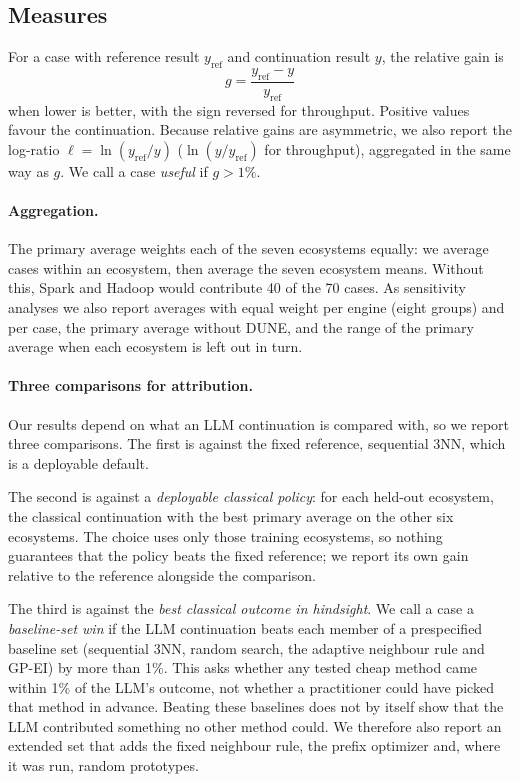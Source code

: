 \subsection{Measures}

For a case with reference result $y_{\mathrm{ref}}$ and continuation result $y$, the relative gain is
\[
g = \frac{y_{\mathrm{ref}} - y}{y_{\mathrm{ref}}}
\]
when lower is better, with the sign reversed for throughput. Positive values favour the continuation. Because relative gains are asymmetric, we also report the log-ratio $\ell = \ln(y_{\mathrm{ref}}/y)$ ($\ln(y/y_{\mathrm{ref}})$ for throughput), aggregated in the same way as $g$. We call a case \emph{useful} if $g > 1\%$.

\paragraph{Aggregation.} The primary average weights each of the seven ecosystems equally: we average cases within an ecosystem, then average the seven ecosystem means. Without this, Spark and Hadoop would contribute 40 of the 70 cases. As sensitivity analyses we also report averages with equal weight per engine (eight groups) and per case, the primary average without DUNE, and the range of the primary average when each ecosystem is left out in turn.

\paragraph{Three comparisons for attribution.} Our results depend on what an LLM continuation is compared with, so we report three comparisons. The first is against the fixed reference, sequential 3NN, which is a deployable default.

The second is against a \emph{deployable classical policy}: for each held-out ecosystem, the classical continuation with the best primary average on the other six ecosystems. The choice uses only those training ecosystems, so nothing guarantees that the policy beats the fixed reference; we report its own gain relative to the reference alongside the comparison.

The third is against the \emph{best classical outcome in hindsight}. We call a case a \emph{baseline-set win} if the LLM continuation beats each member of a prespecified baseline set (sequential 3NN, random search, the adaptive neighbour rule and GP-EI) by more than 1\%. This asks whether any tested cheap method came within 1\% of the LLM's outcome, not whether a practitioner could have picked that method in advance. Beating these baselines does not by itself show that the LLM contributed something no other method could. We therefore also report an extended set that adds the fixed neighbour rule, the prefix optimizer and, where it was run, random prototypes.


